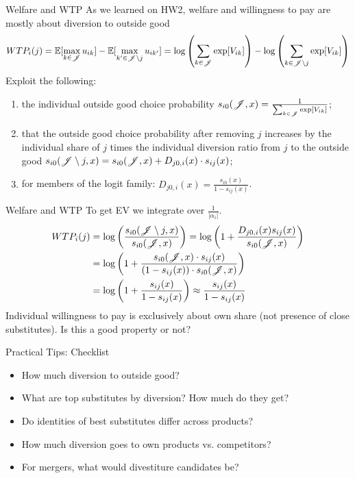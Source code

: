 \documentclass[aspectratio=169,10pt]{beamer}
\begin{document}
\begin{frame}{Welfare and WTP}
As we learned on HW2, welfare and willingness to pay are mostly about \alert{diversion to outside good}
\begin{align*}
WTP_i(j) = \mathbb{E}[\max_{k \in \mathscr{J}} u_{ik}]  - \mathbb{E}[\max_{k' \in \mathscr{J}\setminus j} u_{ik'} ] =  \log \left( \sum_{k \in \mathscr{J}} \exp[V_{ik}] \right)-  \log \left(\sum_{k \in \mathscr{J} \setminus j} \exp[V_{ik}]\right)
\end{align*}
Exploit the following:
\begin{enumerate}
 \item the individual outside good choice probability $s_{i0}(\mathscr{J},x) = \frac{1}{ \sum_{k \in \mathscr{J}} \exp[V_{ik}]}$;
 \item  that the outside good choice probability after removing $j$ increases by the individual share of $j$ times the individual diversion ratio from $j$ to the outside good $s_{i0}(\mathscr{J}\setminus j,x)  = s_{i0}(\mathscr{J},x) + D_{j0,i}(x) \cdot s_{ij}(x)$; 
 \item for members of the logit family: $D_{j0,i}(x) = \frac{s_{i0}(x)}{1-s_{ij}(x)}$. 
\end{enumerate}
\end{frame}

\begin{frame}{Welfare and WTP}
To get EV we integrate over $\frac{1}{|\alpha_i|}$.
\begin{align*}
WTP_i(j) &=\log \left( \frac{s_{i0}(\mathscr{J}\setminus j,x) }{s_{i0}(\mathscr{J},x) }\right)
=\log \left( 1+\frac{D_{j0,i}(x) s_{ij}(x)}{s_{i0}(\mathscr{J},x) }\right)\\
&=\log \left( 1+\frac{s_{i0}(\mathscr{J},x) \cdot s_{ij}(x)}{(1-s_{ij}(x)) \cdot s_{i0}(\mathscr{J},x) }\right)\\
&=\log \left( 1+\frac{s_{ij}(x)}{1-s_{ij}(x)  }\right)
\approx \frac{s_{ij}(x)}{1-s_{ij}(x) }
\end{align*}
Individual willingness to pay is exclusively about \alert{own share} (not presence of close substitutes). Is this a good property or not?
\end{frame}


\begin{frame}{Practical Tips: Checklist}
\begin{itemize}
\item How much diversion to outside good?
\item What are top substitutes by diversion? How much do they get?
\item Do identities of best substitutes differ across products?
\item How much diversion goes to own products vs. competitors?
\item For mergers, what would \alert{divestiture} candidates be?
\end{itemize}
\end{frame}
\end{document}
